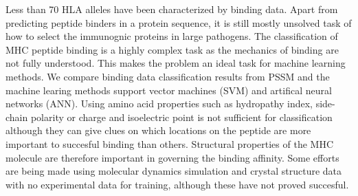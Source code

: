 Less than 70 HLA alleles have been characterized by binding data. Apart from predicting peptide binders in a protein sequence, it is still  mostly unsolved task of how to select the immunognic proteins in large pathogens.
The classification of MHC peptide binding is a highly complex task as the mechanics of binding are not fully understood. 
This makes the problem an ideal task for machine learning methods. We compare binding data classification results from PSSM and the machine learing methods support vector machines (SVM) and artifical neural networks (ANN).
Using amino acid properties such as hydropathy index, side-chain polarity or charge and isoelectric point is not sufficient for classification although they can give clues on which locations on the peptide are more important to succesful binding than others. 
Structural properties of the MHC molecule are therefore important in governing the binding affinity.
Some efforts are being made using molecular dynamics simulation and crystal structure data with no experimental data for training, although these have not proved succesful.
